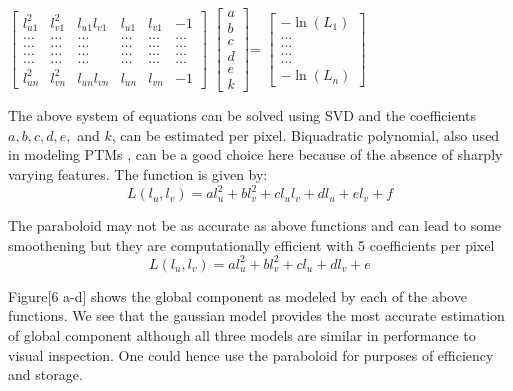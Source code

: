 \begin{center}
$\left[ {\begin{array}{cccccc}
 l_{u1}^2 & l_{v1}^2 & l_{u1}l_{v1} & l_{u1} & l_{v1} & -1 \\
  \dots & \dots  & \dots & \dots & \dots &  \dots \\
\dots & \dots  & \dots & \dots & \dots &  \dots \\
\dots & \dots  & \dots & \dots & \dots &  \dots \\
\dots & \dots  & \dots & \dots & \dots &  \dots \\
l_{un}^2 & l_{vn}^2 & l_{un}l_{vn} & l_{un} & l_{vn} & -1
 \end{array} } \right]
$
$\left[ {\begin{array}{c}
a\\b\\c\\d\\e\\k
 \end{array} } \right]
$=
$\left[ {\begin{array}{c}
-\ln(L_1)\\ \dots\\ \dots\\ \dots \\ \dots \\ -\ln(L_n)
 \end{array} } \right]
$\newline
\end{center}

The above system of equations can be solved using SVD and the coefficients
$a,b,c,d,e,$ and $k$, can be estimated per pixel. Biquadratic polynomial, also
used in modeling PTMs \cite{B6}, can be a good choice here because of the
absence of sharply varying features. The function is given by:
\begin{equation}
L(l_u,l_v) = al_u^2 + bl_v^2 + cl_ul_v + dl_u + el_v +f
\end{equation}

The paraboloid may not be as accurate as above functions and can lead to some
smoothening but they are computationally efficient with 5 coefficients per pixel
\begin{equation}
L(l_u,l_v)= al_u^2 + bl_v^2  + cl_u + dl_v +e
\end{equation}

Figure[6 a-d]
shows the global component as modeled by each of the above functions. We see
that the gaussian model provides the most accurate estimation of global
component although all three models are similar in performance to visual
inspection. One could hence use the paraboloid for purposes of efficiency and
storage.

